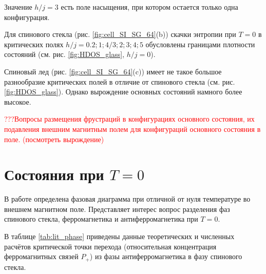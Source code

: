 \documentclass[utf8, babel, sor, jor, amsmath, amssymb, reprint]{elsarticle} %
\newcommand{\todo}[1] {\textcolor{red}{#1}} %
\begin{document}
Значение  $h/j=3$ есть поле насыщения, при котором остается только одна конфигурация.


Для спинового стекла (рис. \ref{fig:cell_SI_SG_64}(b)) скачки энтропии при $T=0$ в критических полях $h/j=0.2; 1; 4/3; 2; 3; 4; 5$ обусловлены границами плотности состояний (см. рис. \ref{fig:HDOS_glass}, $h/j=0$).


Спиновый лед (рис. \ref{fig:cell_SI_SG_64}(c)) имеет не такое большое разнообразие критических полей в отличие от спинового стекла (см. рис. \ref{fig:HDOS_glass}). Однако вырождение основных состояний намного более высокое.

\todo{???Вопросы размещения фрустраций в конфигурациях основного состояния, их подавления внешним магнитным полем для конфигураций основного состояния в поле.
(посмотреть вырождение)}


\section{Состояния при $T = 0$}

В работе \cite{trukhin4855337thermodynamic} определена фазовая диаграмма при отличной от нуля температуре во внешнем магнитном поле. Представляет интерес вопрос разделения фаз спинового стекла, ферромагнетика и антиферромагнетика при $T=0$.

В таблице \ref{tab:lit_phase} приведены данные теоретических и численных расчётов критической точки перехода (относительная концентрация ферромагнитных связей $P_+$) из фазы антиферромагнетика в фазу спинового стекла.
\end{document}
